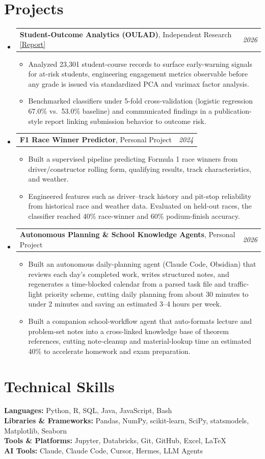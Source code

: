 \documentclass[letterpaper,11pt]{article}
\makeatletter
\newcommand{\resumeItem}[1]{
  \item\small{
    {#1 \vspace{-3pt}}
  }
}
\newcommand{\resumeProjectHeading}[2]{
    \item
    \begin{tabular*}{0.97\textwidth}{l@{\extracolsep{\fill}}r}
      \small#1 & #2 \\
    \end{tabular*}\vspace{-5pt}
}
\newcommand{\resumeSubHeadingListStart}{\begin{itemize}[leftmargin=0.15in, label={}]}
\newcommand{\resumeSubHeadingListEnd}{\end{itemize}}
\newcommand{\resumeItemListStart}{\begin{itemize}}
\newcommand{\resumeItemListEnd}{\end{itemize}\vspace{-9pt}}
\makeatother
\begin{document}
\section{Projects}
  \resumeSubHeadingListStart
    \resumeProjectHeading
      {{\bf Student-Outcome Analytics (OULAD)}, Independent Research \href{https://avi-gobrin.github.io/personal-site/assets/oulad-sta437.pdf}{\color{blue}[Report]}}{{\em 2026}}
      \resumeItemListStart
        \resumeItem{Analyzed 23,301 student-course records to surface early-warning signals for at-risk students, engineering engagement metrics observable before any grade is issued via standardized PCA and varimax factor analysis.}
        \resumeItem{Benchmarked classifiers under 5-fold cross-validation (logistic regression 67.0\% vs.\ 53.0\% baseline) and communicated findings in a publication-style report linking submission behavior to outcome risk.}
      \resumeItemListEnd
    \resumeProjectHeading
      {{\bf F1 Race Winner Predictor}, Personal Project}{{\em 2024}}
      \resumeItemListStart
        \resumeItem{Built a supervised pipeline predicting Formula 1 race winners from driver/constructor rolling form, qualifying results, track characteristics, and weather.}
        \resumeItem{Engineered features such as driver--track history and pit-stop reliability from historical race and weather data. Evaluated on held-out races, the classifier reached 40\% race-winner and 60\% podium-finish accuracy.}
      \resumeItemListEnd
    \resumeProjectHeading
      {{\bf Autonomous Planning \& School Knowledge Agents}, Personal Project}{{\em 2026}}
      \resumeItemListStart
        \resumeItem{Built an autonomous daily-planning agent (Claude Code, Obsidian) that reviews each day's completed work, writes structured notes, and regenerates a time-blocked calendar from a parsed task file and traffic-light priority scheme, cutting daily planning from about 30 minutes to under 2 minutes and saving an estimated 3--4 hours per week.}
        \resumeItem{Built a companion school-workflow agent that auto-formats lecture and problem-set notes into a cross-linked knowledge base of theorem references, cutting note-cleanup and material-lookup time an estimated 40\% to accelerate homework and exam preparation.}
      \resumeItemListEnd
  \resumeSubHeadingListEnd

\section{Technical Skills}
 \begin{itemize}[leftmargin=0.15in, label={}]
    \small{\item{
     \textbf{Languages:} Python, R, SQL, Java, JavaScript, Bash \\
     \textbf{Libraries \& Frameworks:} Pandas, NumPy, scikit-learn, SciPy, statsmodels, Matplotlib, Seaborn \\
     \textbf{Tools \& Platforms:} Jupyter, Databricks, Git, GitHub, Excel, \LaTeX \\
     \textbf{AI Tools:} Claude, Claude Code, Cursor, Hermes, LLM Agents
    }}
 \end{itemize}
\end{document}
